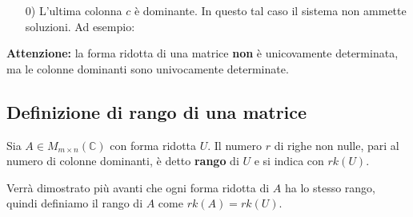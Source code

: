 \documentclass[a4paper]{article}
\theoremstyle{break}
\theoremstyle{break}
\theoremstyle{break}
\theoremstyle{break}
\begin{document}
\begin{enumerate}
\begin{figure}[H]
	      \end{figure}
	\item[0)] L'ultima colonna \( c \) è dominante. In questo tal caso il sistema non ammette
	      soluzioni. Ad esempio:
	      \begin{figure}[H]
		      \centering
	      \end{figure}
\end{enumerate}

\noindent \textbf{Attenzione:} la forma ridotta di una matrice \textbf{non} è unicovamente
determinata, ma le colonne dominanti sono univocamente determinate.

\subsection{Definizione di rango di una matrice}
\begin{definition}
	Sia \( A \in M_{m \times n}(\mathbb{C}) \) con forma ridotta \( U \). Il numero \( r \) di righe non
	nulle, pari al numero di colonne dominanti, è detto \textbf{rango} di \( U \) e si indica
	con \( rk(U) \).
\end{definition}
Verrà dimostrato più avanti che ogni forma ridotta di \( A \) ha lo stesso rango, quindi
definiamo il rango di \( A \) come \( rk(A) = rk(U) \).
\end{document}
